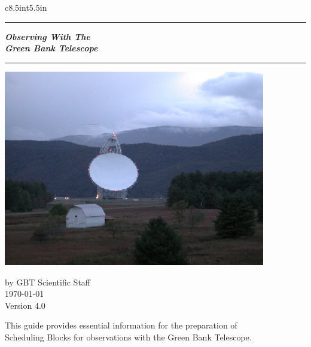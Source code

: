 \documentclass{book}
\begin{document}
\colorbox{coverpages}{
\begin{FrameCover}{c}{8.5in}{t}{5.5in}
\begin{center}
\textcolor{green}{\rule{\linewidth}{3.2mm}}
\textit{\Huge \bf Observing With The\\[5mm]
\Huge \bf Green Bank Telescope}
\textcolor{green}{\rule{\linewidth}{3.2mm}}
\end{center}

\begin{center}
\FramePix[c]{4.5in}
{\bfseries \includegraphics[width=4.5in,bb=0 0 798 599]{GBT.jpg} }
\end{center}

\begin{center}
{{\LARGE by GBT Scientific Staff\\ \bigskip} \large \today \\ \bigskip Version 4.0}
\end{center}

\begin{center}
{This guide provides essential information for the preparation of
\\ Scheduling Blocks for observations with the Green Bank Telescope.
}
\end{center}
\end{FrameCover}
}

\newpage
\setcounter{page}{0}
\newpage
\end{document}
